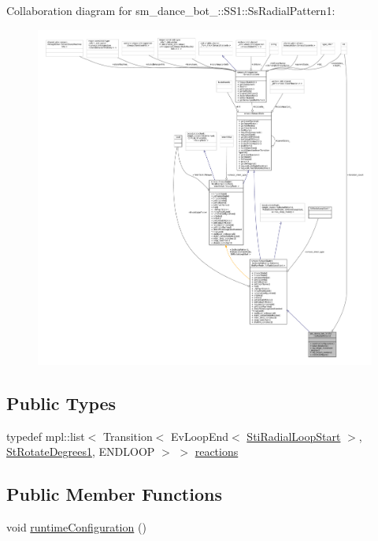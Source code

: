 Collaboration diagram for sm\+\_\+dance\+\_\+bot\+\_\+:\+:S\+S1\+:\+:Ss\+Radial\+Pattern1\+:
\nopagebreak
\begin{figure}[H]
\begin{center}
\leavevmode
\includegraphics[width=350pt]{structsm__dance__bot__3_1_1SS1_1_1SsRadialPattern1__coll__graph}
\end{center}
\end{figure}
\subsection*{Public Types}
\begin{DoxyCompactItemize}
\item 
typedef mpl\+::list$<$ Transition$<$ Ev\+Loop\+End$<$ \hyperlink{structsm__dance__bot__3_1_1radial__motion__states_1_1StiRadialLoopStart}{Sti\+Radial\+Loop\+Start} $>$, \hyperlink{structsm__dance__bot__3_1_1StRotateDegrees1}{St\+Rotate\+Degrees1}, E\+N\+D\+L\+O\+OP $>$ $>$ \hyperlink{structsm__dance__bot__3_1_1SS1_1_1SsRadialPattern1_ab47da32146955fab5a626e246dec2707}{reactions}
\end{DoxyCompactItemize}
\subsection*{Public Member Functions}
\begin{DoxyCompactItemize}
\item 
void \hyperlink{structsm__dance__bot__3_1_1SS1_1_1SsRadialPattern1_a75515093c1085ba98feb31baa8bf1cad}{runtime\+Configuration} ()
\end{DoxyCompactItemize}
